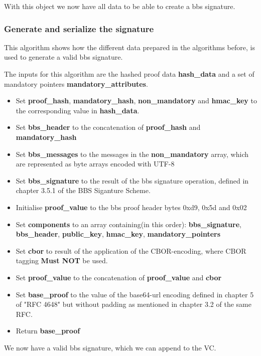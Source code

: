 \documentclass[
	a4paper               %
	,bibliography=totoc   %
	,listof=totoc         %
	,monolingual
	twoside=false,
]{bfhthesis}              %
\begin{document}
With this object we now have all data to be able to create a bbs signature.

\subsubsection{Generate and serialize the signature}
\label{subsubsec:sign}
This algorithm shows how the different data prepared in the algorithms before, is used to generate a valid bbs signature.

The inputs for this algorithm are the hashed proof data \textbf{hash\_data} and a set of mandatory pointers \textbf{mandatory\_attributes}.

\begin{itemize}
	\item Set \textbf{proof\_hash}, \textbf{mandatory\_hash}, \textbf{non\_mandatory} and \textbf{hmac\_key} to the corresponding value in \textbf{hash\_data}.
	\item Set \textbf{bbs\_header} to the concatenation of \textbf{proof\_hash} and \textbf{mandatory\_hash}
	\item Set \textbf{bbs\_messages} to the messages in the \textbf{non\_mandatory} array, which are represented as byte arrays encoded with UTF-8
	\item Set \textbf{bbs\_signature} to the result of the bbs signature operation, defined in chapter 3.5.1 of the BBS Siganture Scheme\cite{bbs-signature-scheme}.
	\item Initialise \textbf{proof\_value} to the bbs proof header bytes 0xd9, 0x5d and 0x02
	\item Set \textbf{components} to an array containing(in this order): \textbf{bbs\_signature}, \textbf{bbs\_header}, \textbf{public\_key}, \textbf{hmac\_key}, \textbf{mandatory\_pointers}
	\item Set \textbf{cbor} to result of the application of the CBOR-encoding\cite{cbor}, where CBOR tagging \textbf{Must NOT} be used.
	\item Set \textbf{proof\_value} to the concatenation of \textbf{proof\_value} and \textbf{cbor}
	\item Set \textbf{base\_proof} to the value of the base64-url encoding defined in chapter 5 of "RFC 4648"\cite{base64} but without padding as mentioned in chapter 3.2 of the same RFC.
	\item Return \textbf{base\_proof}
\end{itemize}

We now have a valid bbs signature, which we can append to the VC.
\end{document}
